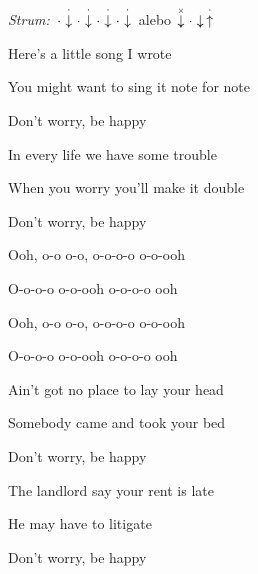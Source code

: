 \begin{song}


\begin{headerbox}
\RaiseBoxWithChucks
{} \quad
\textit{Strum:} $\Miss\StaccatoDown\Miss\StaccatoDown\Miss\StaccatoDown\Miss\StaccatoDown$ alebo $\ChuckDown\Miss\Down\StaccatoUp$ 
\end{headerbox}


\begin{hchordbox}
\end{hchordbox}

\bigskip

\Large

 Here's a little song I wrote \par
You might want to sing it note for note \par
Don't worry, be happy \par

\bigskip

 In every life we have some trouble \par
{} When you worry you'll make it double \par
Don't worry, be happy  \par

\bigskip

\begin{chorusboxwide}{\Chorus}
Ooh, o-o o-o, o-o-o-o o-o-ooh  \par
O-o-o-o o-o-ooh  o-o-o-o ooh  \par
{}Ooh, o-o o-o, o-o-o-o o-o-ooh  \par
O-o-o-o o-o-ooh  o-o-o-o ooh  \par
\end{chorusboxwide}

\bigskip

 Ain't got no place to lay your head \par
{} Somebody came and took your bed \par
Don't worry, be happy \par

\bigskip

The landlord say your rent is late \par
{} He may have to litigate \par
Don't worry, be happy \par


\end{song}
